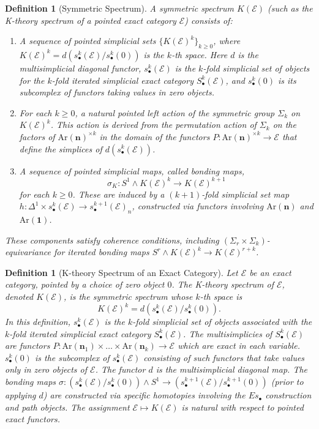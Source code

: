 \documentclass[12pt]{report}
\numberwithin{equation}{section}
\newtheorem{definition}[dummy]{Definition}
\begin{document}
	\begin{definition}[Symmetric Spectrum]
		A {symmetric spectrum} $K(\mathcal{E})$ (such as the K-theory spectrum of a pointed exact category $\mathcal{E}$) consists of:
		\begin{enumerate}
			\item A sequence of pointed simplicial sets $\{K(\mathcal{E})^k\}_{k \ge 0}$, where $K(\mathcal{E})^k = d(s^k_\bullet(\mathcal{E}) / s^k_\bullet(0))$ is the $k$-th space. Here $d$ is the multisimplicial diagonal functor, $s^k_\bullet(\mathcal{E})$ is the $k$-fold simplicial set of objects for the $k$-fold iterated simplicial exact category $S^k_\bullet(\mathcal{E})$, and $s^k_\bullet(0)$ is its subcomplex of functors taking values in zero objects.
			\item For each $k \ge 0$, a natural pointed left action of the symmetric group $\Sigma_k$ on $K(\mathcal{E})^k$. This action is derived from the permutation action of $\Sigma_k$ on the factors of $\mathrm{Ar}(\mathbf{n})^{\times k}$ in the domain of the functors $P: \mathrm{Ar}(\mathbf{n})^{\times k} \to \mathcal{E}$ that define the simplices of $d(s^k_\bullet(\mathcal{E}))$.
			\item A sequence of pointed simplicial maps, called bonding maps,
			\[ \sigma_K : S^1 \wedge K(\mathcal{E})^k \to K(\mathcal{E})^{k+1} \]
			for each $k \ge 0$. These are induced by a $(k+1)$-fold simplicial set map $h : \Delta^1 \times s^k_\bullet(\mathcal{E}) \to s^{k+1}_\bullet(\mathcal{E})_n$, constructed via functors involving $\mathrm{Ar}(\mathbf{n})$ and $\mathrm{Ar}(\mathbf{1})$.
		\end{enumerate}
		These components satisfy coherence conditions, including $(\Sigma_r \times \Sigma_k)$-equivariance for iterated bonding maps $S^r \wedge K(\mathcal{E})^k \to K(\mathcal{E})^{r+k}$.
	\end{definition}
	
	\begin{definition}[K-theory Spectrum of an Exact Category]
		Let $\mathcal{E}$ be an exact category, pointed by a choice of zero object $0$. The {K-theory spectrum of $\mathcal{E}$}, denoted $K(\mathcal{E})$, is the symmetric spectrum whose $k$-th space is
		\[ K(\mathcal{E})^k = d(s^k_\bullet(\mathcal{E}) / s^k_\bullet(0)). \]
		In this definition, $s^k_\bullet(\mathcal{E})$ is the $k$-fold simplicial set of objects associated with the $k$-fold iterated simplicial exact category $S^k_\bullet(\mathcal{E})$. The multisimplicies of $S^k_\bullet(\mathcal{E})$ are functors $P : \mathrm{Ar}(\mathbf{n}_1) \times \dots \times \mathrm{Ar}(\mathbf{n}_k) \to \mathcal{E}$ which are exact in each variable. $s^k_\bullet(0)$ is the subcomplex of $s^k_\bullet(\mathcal{E})$ consisting of such functors that take values only in zero objects of $\mathcal{E}$. The functor $d$ is the multisimplicial diagonal map. The bonding maps $\sigma : (s^k_\bullet(\mathcal{E})/s^k_\bullet(0)) \wedge S^1 \to (s^{k+1}_\bullet(\mathcal{E})/s^{k+1}_\bullet(0))$ (prior to applying $d$) are constructed via specific homotopies involving the $Es_\bullet$ construction and path objects. The assignment $\mathcal{E} \mapsto K(\mathcal{E})$ is natural with respect to pointed exact functors.
	\end{definition}
	
\end{document}
